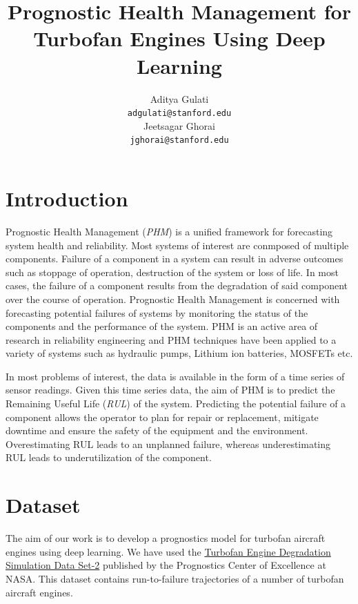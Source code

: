 \documentclass[a4paper,12pt]{article}
\title{Prognostic Health Management for Turbofan Engines Using Deep Learning}
\author{
Aditya Gulati\\
\texttt{adgulati@stanford.edu} \\
\And
Jeetsagar Ghorai \\
\texttt{jghorai@stanford.edu} \\
}
\begin{document}
\maketitle

\section{Introduction}

Prognostic Health Management (\emph{PHM}) is a unified framework for
forecasting system health and reliability. Most systems of interest are
conmposed of multiple components. Failure of a component in a system can result
in adverse outcomes such as stoppage of operation, destruction of the system or
loss of life. In most cases, the failure of a component results from the
degradation of said component over the course of operation. Prognostic Health
Management is concerned with forecasting potential failures of systems by
monitoring the status of the components and the performance of the system. PHM
is an active area of research in reliability engineering and PHM techniques have
been applied to a variety of systems such as hydraulic pumps, Lithium ion
batteries, MOSFETs etc.

In most problems of interest, the data is available in the form of a time series
of sensor readings. Given this time series data, the aim of PHM is to predict
the Remaining Useful Life (\emph{RUL}) of the system. Predicting the potential
failure of a component allows the operator to plan for repair or replacement,
mitigate downtime and ensure the safety of the equipment and the environment.
Overestimating RUL leads to an unplanned failure, whereas underestimating RUL
leads to underutilization of the component.


\section{Dataset}

The aim of our work is to develop a prognostics model for turbofan aircraft
engines using deep learning. We have used the
\href{https://ti.arc.nasa.gov/tech/dash/groups/pcoe/prognostic-data-repository}
{Turbofan Engine Degradation Simulation Data Set-2} published by the Prognostics
Center of Excellence at NASA. This dataset contains run-to-failure trajectories
of a number of turbofan aircraft engines.
\end{document}
